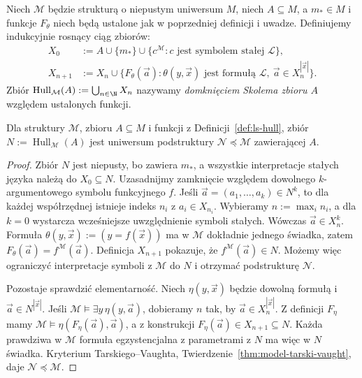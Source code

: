 \begin{definicja}
\label{def:ls-hull}
Niech $\mathcal M$ będzie strukturą o niepustym
uniwersum $M$, niech $A\subseteq M$, a
$m_*\in M$ i funkcje $F_\theta$ niech będą ustalone
jak w poprzedniej definicji i uwadze.
Definiujemy indukcyjnie rosnący ciąg zbiorów:
\[
\begin{aligned}
X_0&:=A\cup\{m_*\}\cup
       \{c^{\mathcal M}:c\text{ jest symbolem stałej }\mathcal L\},\\
X_{n+1}&:=X_n\cup
\{F_\theta(\vec a):
  \theta(y,\vec x)\text{ jest formułą }\mathcal L,\
  \vec a\in X_n^{|\vec x|}\}.
\end{aligned}
\]
Zbiór $\operatorname{Hull}_{\mathcal M}(A):=
\bigcup_{n\in\N}X_n$ nazywamy
\emph{domknięciem Skolema zbioru $A$}
względem ustalonych funkcji.
\end{definicja}

\begin{lemat}
\label{lem:ls-hull-elementary}
Dla struktury $\mathcal M$, zbioru $A\subseteq M$
i funkcji z Definicji~\ref{def:ls-hull},
zbiór $N:=\operatorname{Hull}_{\mathcal M}(A)$
jest uniwersum podstruktury
$\mathcal N\preccurlyeq\mathcal M$ zawierającej $A$.
\end{lemat}
\begin{proof}
Zbiór $N$ jest niepusty, bo zawiera $m_*$,
a wszystkie interpretacje stałych języka
należą do $X_0\subseteq N$.
Uzasadnijmy zamknięcie względem dowolnego
$k$-argumentowego symbolu funkcyjnego $f$.
Jeśli $\vec a=(a_1,\ldots,a_k)\in N^k$,
to dla każdej współrzędnej istnieje indeks $n_i$
z $a_i\in X_{n_i}$. Wybieramy
$n:=\max_i n_i$, a dla $k=0$ wystarcza
wcześniejsze uwzględnienie symboli stałych.
Wówczas $\vec a\in X_n^k$.
Formuła $\theta(y,\vec x):=(y=f(\vec x))$
ma w $\mathcal M$ dokładnie jednego świadka,
zatem $F_\theta(\vec a)=f^{\mathcal M}(\vec a)$.
Definicja $X_{n+1}$ pokazuje, że
$f^{\mathcal M}(\vec a)\in N$.
Możemy więc ograniczyć interpretacje symboli
z $\mathcal M$ do $N$ i otrzymać podstrukturę
$\mathcal N$.

Pozostaje sprawdzić elementarność.
Niech $\eta(y,\vec x)$ będzie dowolną
formułą i $\vec a\in N^{|\vec x|}$.
Jeśli $\mathcal M\models\exists y\,\eta(y,\vec a)$,
dobieramy $n$ tak, by $\vec a\in X_n^{|\vec x|}$.
Z definicji $F_\eta$ mamy
$\mathcal M\models
\eta(F_\eta(\vec a),\vec a)$,
a z konstrukcji $F_\eta(\vec a)\in X_{n+1}\subseteq N$.
Każda prawdziwa w $\mathcal M$ formuła egzystencjalna
z parametrami z $N$ ma więc w $N$ świadka.
Kryterium Tarskiego--Vaughta,
Twierdzenie~\ref{thm:model-tarski-vaught},
daje $\mathcal N\preccurlyeq\mathcal M$.
\end{proof}


